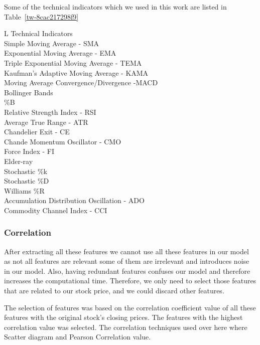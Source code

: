 \documentclass[5p,,preprint,12pt,twocolumn]{elsarticle}
\def\tblbottomrule{\noalign{\vspace*{6pt}}\hline\noalign{\vspace*{2pt}}}
\def\tblmidrule{\noalign{\vspace*{6pt}}\hline\noalign{\vspace*{2pt}}}
\begin{document}
Some of the technical indicators which we used in this work are listed in Table~\ref{tw-8cac217298f9}
\begin{table}[!htbp]
\caption{{Technical Indicators} }
\label{tw-8cac217298f9}
\def\arraystretch{1}
\ignorespaces 
\centering 
\begin{tabulary}{\linewidth}{L}
\hline 
Technical Indicators\\
\tblmidrule 
Simple Moving Average - SMA\\
Exponential Moving Average - EMA\\
Triple Exponential Moving Average - TEMA\\
Kaufman's Adaptive Moving Average - KAMA\\
Moving Average Convergence/Divergence -MACD\\
Bollinger Bands\\
\%B\\
Relative Strength Index - RSI \\
 Average True Range - ATR\\
Chandelier Exit - CE\\
Chande Momentum Oscillator - CMO\\
Force Index - FI\\
Elder-ray\\
Stochastic \%k\\
Stochastic \%D\\
Williams \%R\\
Accumulation Distribution Oscillation - ADO\\
Commodity Channel Index - CCI\\
\tblbottomrule 
\end{tabulary}\par 
\end{table}




\subsubsection{Correlation}After extracting all these features we cannot use all these features in our model as not all features are relevant some of them are irrelevant and introduces noise in our model. Also, having redundant features confuses our model and therefore increases the computational time. Therefore, we only need to select those features that are related to our stock price, and we could discard other features.

The selection of features was based on the correlation coefficient value of all these features with the original stock's closing prices. The features with the highest correlation value was selected. The correlation techniques used over here where Scatter diagram and Pearson Correlation value.
\end{document}
